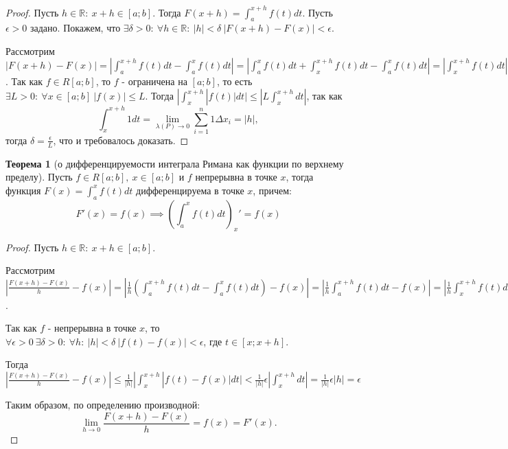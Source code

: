 \documentclass{report}
\theoremstyle{definition}
\newtheorem{theorem}{Теорема}[section]
\begin{document}
\begin{proof}
  Пусть $h\in \mathbb{R}: \ x + h \in [a;b]$. Тогда $F(x+h) = \int_{a}^{x+h}f(t)dt$. Пусть
  $\epsilon>0$ задано. Покажем, что $\exists\delta>0: \ \forall h \in \mathbb{R}: \ |h|<\delta \
    | F(x+h) - F(x) | < \epsilon$.

  Рассмотрим $| F(x+h) - F(x) | = | \int_{a}^{x+h}f(t)dt - \int_{a}^{x}f(t)dt | = | \int_{a}^{x}f(t)dt +
    \int_{x}^{x+h}f(t)dt - \int_{a}^{x}f(t)dt | = | \int_{x}^{x+h}f(t)dt | \leqslant |\int_{x}^{x+h}| f(t) |dt|$.
  Так как $f\in R[a;b]$, то $f$ - ограничена на $[a;b]$, то есть $\exists L > 0: \ \forall x \in [a;b] \
    | f(x) | \leqslant L$. Тогда $|\int_{x}^{x+h}| f(t) |dt| \leqslant | L \int_{x}^{x+h}dt |$, так как
  \begin{equation*}
    \int_{x}^{x+h}1dt = \underset{\lambda(P)\rightarrow0}{\lim}\sum_{i=1}^{n}1\Delta x_{i} = | h |,
  \end{equation*}
  тогда $\delta = \frac{\epsilon}{L}$, что и требовалось доказать.
\end{proof}

\begin{theorem}[о дифференцируемости интеграла Римана как функции по верхнему пределу]
  Пусть $f\in R[a;b], \ x \in [a;b]$ и $f$ непрерывна в точке $x$, тогда функция $F(x) = \int_{a}^{x}f(t)dt$
  дифференцируема в точке $x$, причем:
  \begin{equation*}
    F'(x) = f(x) \implies (\int_{a}^{x}f(t)dt)_{x}'=f(x)
  \end{equation*}
\end{theorem}

\begin{proof}
  Пусть $h\in\mathbb{R}: \ x+h \in [a;b]$.

  Рассмотрим $|\frac{F(x+h) - F(x)}{h} - f(x)| = | \frac{1}{h}(\int_{a}^{x+h}f(t)dt - \int_{a}^{x}f(t)dt) -
    f(x) | = | \frac{1}{h} \int_{a}^{x+h}f(t)dt - f(x) | = | \frac{1}{h}\int_{x}^{x+h}f(t)dt - \frac{f(x)}{h}
    \int_{x}^{x+h}dt | = | \frac{1}{h}(\int_{x}^{x+h}f(t)dt - \int_{x}^{x+h}f(x)dt) | = | \frac{1}{h}
    (\int_{x}^{x+h}(f(t)-f(x))dt) | = \frac{1}{|h|}| \int_{x}^{x+h}| f(t) - f(x) |dt |$.

  Так как $f$ - непрерывна в точке $x$, то $\forall \epsilon>0 \ \exists \delta>0: \ \forall h: \ |h|<\delta
    \ | f(t) - f(x) | < \epsilon$, где $t\in[x;x+h]$.

  Тогда $|\frac{F(x+h) - F(x)}{h} - f(x) | \leqslant \frac{1}{|h|}| \int_{x}^{x+h}| f(t) - f(x) |dt | <
    \frac{1}{|h|}\epsilon| \int_{x}^{x+h}dt | = \frac{1}{|h|}\epsilon|h| = \epsilon$

  Таким образом, по определению производной:
  \begin{equation*}
    \underset{h\rightarrow0}{\lim}\frac{F(x+h) - F(x)}{h} = f(x) = F'(x).
  \end{equation*}
\end{proof}
\end{document}
